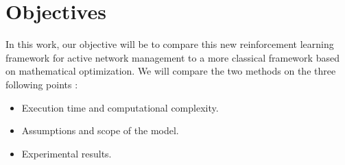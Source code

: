 \section{Objectives}
\label{sec:objective}

In this work, our objective will be to compare this new reinforcement learning framework for active network management to a more classical framework based on mathematical optimization.
We will compare the two methods on the three following points :
\begin{itemize}
\item Execution time and computational complexity.
\item Assumptions and scope of the model.
\item Experimental results.
\end{itemize}
